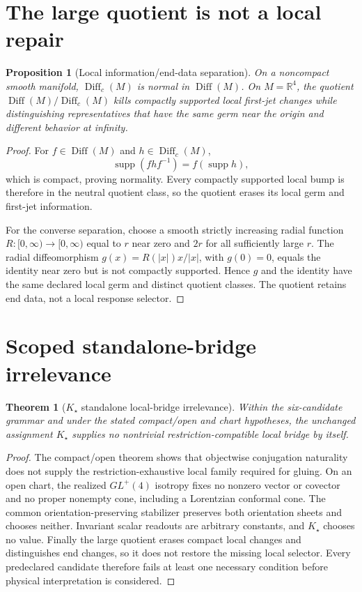 \documentclass[11pt]{article}
\newtheorem{theorem}{Theorem}
\newtheorem{proposition}{Proposition}
\newcommand{\Diff}{\operatorname{Diff}}
\newcommand{\Diffc}{\operatorname{Diff}_{c}}
\newcommand{\Kstar}{K_{\star}}
\begin{document}
\section{The large quotient is not a local repair}

\begin{proposition}[Local information/end-data separation]
On a noncompact smooth manifold, $\Diffc(M)$ is normal in $\Diff(M)$.  On
$M=\mathbb{R}^{4}$, the quotient $\Diff(M)/\Diffc(M)$ kills compactly
supported local first-jet changes while distinguishing representatives that
have the same germ near the origin and different behavior at infinity.
\end{proposition}

\begin{proof}
For $f\in\Diff(M)$ and $h\in\Diffc(M)$,
\[
\operatorname{supp}(fhf^{-1})=f(\operatorname{supp}h),
\]
which is compact, proving normality.  Every compactly supported local bump is
therefore in the neutral quotient class, so the quotient erases its local
germ and first-jet information.

For the converse separation, choose a smooth strictly increasing radial
function $R:[0,\infty)\to[0,\infty)$ equal to $r$ near zero and $2r$ for all
sufficiently large $r$.  The radial diffeomorphism
$g(x)=R(|x|)x/|x|$, with $g(0)=0$, equals the identity near zero but is not
compactly supported.  Hence $g$ and the identity have the same declared local
germ and distinct quotient classes.  The quotient retains end data, not a
local response selector.
\end{proof}

\section{Scoped standalone-bridge irrelevance}

\begin{theorem}[$\Kstar$ standalone local-bridge irrelevance]
Within the six-candidate grammar and under the stated compact/open and chart
hypotheses, the unchanged assignment $\Kstar$ supplies no nontrivial
restriction-compatible local bridge by itself.
\end{theorem}

\begin{proof}
The compact/open theorem shows that objectwise conjugation naturality does not
supply the restriction-exhaustive local family required for gluing.  On an
open chart, the realized $GL^{+}(4)$ isotropy fixes no nonzero vector or
covector and no proper nonempty cone, including a Lorentzian conformal cone.
The common orientation-preserving stabilizer preserves both orientation
sheets and chooses neither.  Invariant scalar readouts are arbitrary
constants, and $\Kstar$ chooses no value.  Finally the large quotient erases
compact local changes and distinguishes end changes, so it does not restore
the missing local selector.  Every predeclared candidate therefore fails at
least one necessary condition before physical interpretation is considered.
\end{proof}
\end{document}

